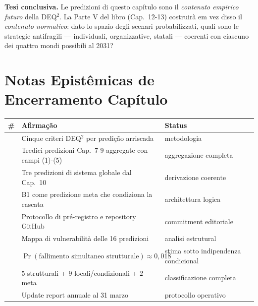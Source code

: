 \Hypoth{} \textbf{Tesi conclusiva.} Le predizioni di questo capítulo
sono il \emph{contenuto empirico futuro} della DEQ$^2$. La Parte V del
libro (Cap.~12-13) costruirà em vez disso il \emph{contenuto normativo}: dato
lo spazio degli scenari probabilizzati, quali sono le strategie
antifragili --- individuali, organizzative, statali --- coerenti con
ciascuno dei quattro mondi possibili al 2031?



\section{Notas Epistêmicas de Encerramento
Capítulo}\label{note-epistemiche-di-chiusura-capítulo}

{\def\LTcaptype{none} %
{\small\begin{longtable}[]{@{}
  >{\raggedright\arraybackslash}p{}
  >{\raggedright\arraybackslash}p{}
  >{\raggedright\arraybackslash}p{}@{}}
\toprule\noalign{}
\begin{minipage}[b]{\linewidth}\raggedright
\#
\end{minipage} & \begin{minipage}[b]{\linewidth}\raggedright
Afirmação
\end{minipage} & \begin{minipage}[b]{\linewidth}\raggedright
Status
\end{minipage} \\
\midrule\noalign{}
\endhead
\bottomrule\noalign{}
\endlastfoot
1 & Cinque criteri DEQ$^2$ per predição arriscada & \Hypoth{}
metodologia \\
2 & Tredici predizioni Cap.~7-9 aggregate con campi (1)-(5) & \Proved{}
aggregazione completa \\
3 & Tre predizioni di sistema globale dal Cap.~10 & \Hypoth{}
derivazione coerente \\
4 & B1 come predizione meta che condiziona la cascata & \Hypoth{}
architettura logica \\
5 & Protocollo di pré-registro e repository GitHub & \Hypoth{}
commitment editoriale \\
6 & Mappa di vulnerabilità delle 16 predizioni & \Hypoth{} analisi
estrutural \\
7 & \(\Pr(\text{fallimento simultaneo strutturale}) \approx 0{,}018\) &
\Conj{} stima sotto indipendenza condicional \\
8 & \(5\) strutturali + \(9\) locali/condizionali + \(2\) meta &
\Proved{} classificazione completa \\
9 & Update report annuale al 31 marzo & \Hypoth{} protocollo
operativo \\
\end{longtable}}
}



